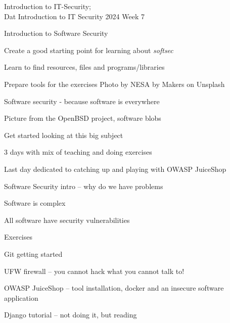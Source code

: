 \documentclass[Screen16to9,17pt]{foils}
\begin{document}
{Introduction to IT-Security;\\Dat Introduction to IT Security 2024 Week 7}

\hlkprofiluk



\begin{list2}
\item Introduction to Software Security
\item Create a good starting point for learning about \emph{softsec}
\item Learn to find resources, files and programs/libraries
\item Prepare tools for the exercises \hfill {\small Photo by NESA by Makers on Unsplash}
\end{list2}




\begin{list1}
\item Software security - because software is everywhere
\end{list1}



Picture from the OpenBSD project, software blobs

\begin{list2}
\item Get started looking at this big subject
\item 3 days with mix of teaching and doing exercises
\item Last day dedicated to catching up and playing with OWASP JuiceShop
\end{list2}



\begin{list2}
\item Software Security intro -- why do we have problems
\item Software is complex
\item All software have security vulnerabilities
\end{list2}

Exercises
\begin{list2}
\item Git getting started
\item UFW firewall -- you cannot hack what you cannot talk to!
\item OWASP JuiceShop -- tool installation, docker and an insecure software application
\item Django tutorial -- not doing it, but reading
\end{list2}
\end{document}
